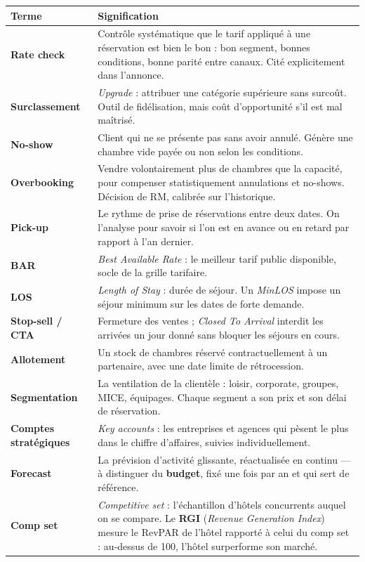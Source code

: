 \documentclass[11pt,a4paper]{article}
\newcommand{\terme}[1]{\textcolor{bleusof}{\textbf{#1}}}
\begin{document}
\begin{center}
\footnotesize\renewcommand{\arraystretch}{1.06}
\begin{tabularx}{\textwidth}{@{}L{3.5cm} X@{}}
\toprule
{}\textbf{Terme} & \textbf{Signification} \\
\midrule
\terme{Rate check} & Contrôle systématique que le tarif appliqué à une réservation est bien le bon : bon segment, bonnes conditions, bonne parité entre canaux. Cité explicitement dans l'annonce. \\
\terme{Surclassement} & \emph{Upgrade} : attribuer une catégorie supérieure sans surcoût. Outil de fidélisation, mais coût d'opportunité s'il est mal maîtrisé. \\
\terme{No-show} & Client qui ne se présente pas sans avoir annulé. Génère une chambre vide payée ou non selon les conditions. \\
\terme{Overbooking} & Vendre volontairement plus de chambres que la capacité, pour compenser statistiquement annulations et no-shows. Décision de RM, calibrée sur l'historique. \\
\terme{Pick-up} & Le rythme de prise de réservations entre deux dates. On l'analyse pour savoir si l'on est en avance ou en retard par rapport à l'an dernier. \\
\terme{BAR} & \emph{Best Available Rate} : le meilleur tarif public disponible, socle de la grille tarifaire. \\
\terme{LOS} & \emph{Length of Stay} : durée de séjour. Un \emph{MinLOS} impose un séjour minimum sur les dates de forte demande. \\
\terme{Stop-sell / CTA} & Fermeture des ventes ; \emph{Closed To Arrival} interdit les arrivées un jour donné sans bloquer les séjours en cours. \\
\terme{Allotement} & Un stock de chambres réservé contractuellement à un partenaire, avec une date limite de rétrocession. \\
\terme{Segmentation} & La ventilation de la clientèle : loisir, corporate, groupes, MICE, équipages. Chaque segment a son prix et son délai de réservation. \\
\terme{Comptes stratégiques} & \emph{Key accounts} : les entreprises et agences qui pèsent le plus dans le chiffre d'affaires, suivies individuellement. \\
\terme{Forecast} & La prévision d'activité glissante, réactualisée en continu --- à distinguer du \terme{budget}, fixé une fois par an et qui sert de référence. \\
\terme{Comp set} & \emph{Competitive set} : l'échantillon d'hôtels concurrents auquel on se compare. Le \terme{RGI} (\emph{Revenue Generation Index}) mesure le RevPAR de l'hôtel rapporté à celui du comp set : au-dessus de 100, l'hôtel surperforme son marché. \\
\bottomrule
\end{tabularx}
\end{center}
\end{document}
